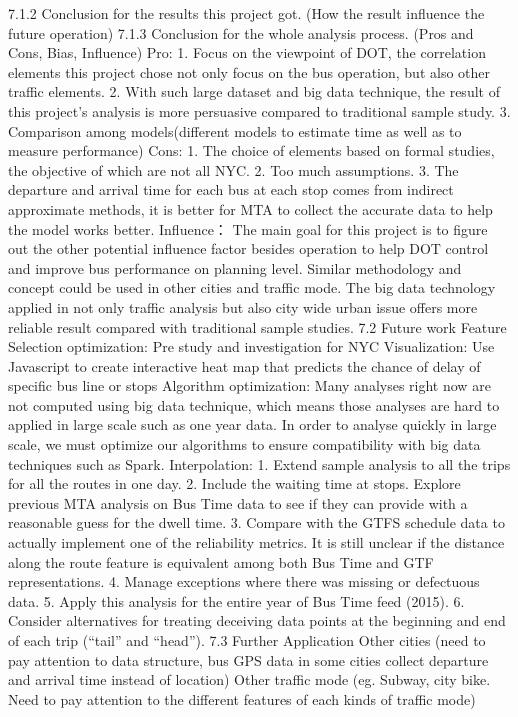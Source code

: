 \documentclass[12pt,journal,compsoc]{IEEEtran}
\begin{document}
7.1.2 Conclusion for the results this project got. (How the result influence the future operation)
7.1.3 Conclusion for the whole analysis process. (Pros and Cons, Bias, Influence)
Pro:
1. Focus on the viewpoint of DOT, the correlation elements this project chose not only focus on the bus operation, but also other traffic elements.
2. With such large dataset and big data technique, the result of this project’s analysis is more persuasive compared to traditional sample study.
3. Comparison among models(different models to estimate time as well as to measure performance)
Cons:
1. The choice of elements based on formal studies, the objective of which are not all NYC.
2. Too much assumptions.
3. The departure and arrival time for each bus at each stop comes from indirect approximate methods, it is better for MTA to collect the accurate data to help the model works better.
Influence：
The main goal for this project is to figure out the other potential influence factor besides operation to help DOT control and improve bus performance on planning level. Similar methodology and concept could be used in other cities and traffic mode. The big data technology applied in not only traffic analysis but also city wide urban issue offers more reliable result compared with traditional sample studies. 
7.2 Future work
Feature Selection optimization: Pre study and investigation for NYC
Visualization: Use Javascript to create interactive heat map that predicts the chance of delay of specific bus line or stops
Algorithm optimization: Many analyses right now are not computed using big data technique, which means those analyses are hard to applied in large scale such as one year data. In order to analyse quickly in large scale, we must optimize our algorithms to ensure compatibility with big data techniques such as Spark.
Interpolation:
1. Extend sample analysis to all the trips for all the routes in one day.
2. Include the waiting time at stops. Explore previous MTA analysis on Bus Time data to see if   they can provide with a reasonable guess for the dwell time.
3. Compare with the GTFS schedule data to actually implement one of the reliability metrics. It is still unclear if the distance along the route feature is equivalent among both Bus Time and GTF representations.
4. Manage exceptions where there was missing or defectuous data.
5. Apply this analysis for the entire year of Bus Time feed (2015).
6. Consider alternatives for treating deceiving data points at the beginning and end of each trip (“tail” and “head”).
7.3 Further Application
Other cities (need to pay attention to data structure, bus GPS data in some cities collect departure and arrival time instead of location)
Other traffic mode (eg. Subway, city bike. Need to pay attention to the different features of each kinds of traffic mode)
\end{document}
